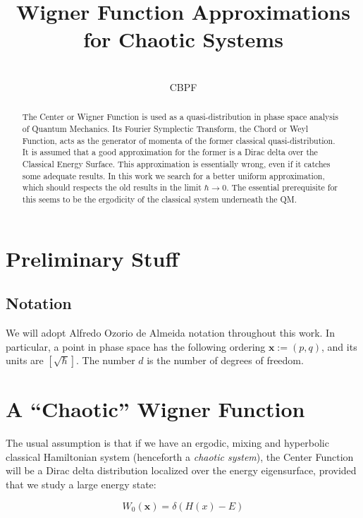 \documentclass[a4paper,10pt]{article}
\title{ Wigner Function Approximations for Chaotic Systems}
\author{\\CBPF}
\newcommand{\xfase}{\mathbf{x}}
\begin{document}
\maketitle

\begin{abstract}


The Center or Wigner Function is used as a quasi-distribution in 
phase space analysis
of Quantum Mechanics. Its Fourier Symplectic Transform, 
the Chord or Weyl Function, 
acts as the generator of momenta of the former 
classical quasi-distribution. It is
assumed that a good approximation for the former is a Dirac delta over
the Classical Energy Surface. This approximation is essentially wrong,
even if it catches some adequate results.
In this work we search for a better uniform approximation, which
should respects the old results in the limit $\hbar\rightarrow 0$.
The essential prerequisite for this seems to be the ergodicity of
the classical system underneath the QM.

\end{abstract}

\section{Preliminary Stuff}

\subsection{Notation}

We will adopt Alfredo Ozorio de Almeida notation throughout this work. 
In particular, a point in phase space has the 
following ordering  $\xfase:=(p,q)$, and its units are $[\sqrt{\hbar}]$.
The number $d$ is the number of degrees of freedom.


\section{A ``Chaotic'' Wigner Function}

The usual assumption is that if we have an ergodic, mixing and hyperbolic
classical Hamiltonian system (henceforth a \emph{chaotic system}), the
Center Function will be a Dirac delta distribution localized over the
energy eigensurface, provided that we study  a large energy state:

\begin{equation}
W_0(\xfase)=\delta (H(x)-E)
\end{equation}
\end{document}
